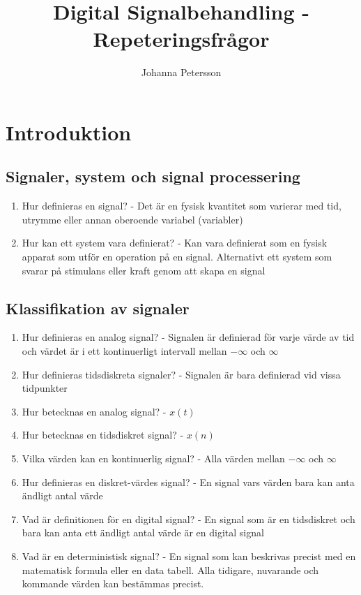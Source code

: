\documentclass[11pt]{report}
\begin{document}
\title{Digital Signalbehandling - Repeteringsfrågor}
\author{Johanna Petersson}
\maketitle

\chapter{Introduktion}
\section{Signaler, system och signal processering}
\begin{enumerate}
	\item Hur definieras en signal? - Det är en fysisk kvantitet som varierar med tid, utrymme eller annan oberoende variabel (variabler) 
	\item Hur kan ett system vara definierat? - Kan vara definierat som en fysisk apparat som utför en operation på en signal. Alternativt ett system som svarar på stimulans eller kraft genom att skapa en signal
\end{enumerate}

\section{Klassifikation av signaler}
\begin{enumerate}
	\item Hur definieras en analog signal? - Signalen är definierad för varje värde av tid och värdet är i ett kontinuerligt intervall mellan $-\infty$ och $\infty$
	\item Hur definieras tidsdiskreta signaler? - Signalen är bara definierad vid vissa tidpunkter
	\item Hur betecknas en analog signal? - $x(t)$
	\item Hur betecknas en tidsdiskret signal? - $x(n)$
	\item Vilka värden kan en kontinuerlig signal? - Alla värden mellan $-\infty$ och $\infty$
	\item Hur definieras en diskret-värdes signal? - En signal vars värden bara kan anta ändligt antal värde 
	\item Vad är definitionen för en digital signal? - En signal som är en tidsdiskret och bara kan anta ett ändligt antal värde är en digital signal 
	\item Vad är en deterministisk signal? - En signal som kan beskrivas precist med en matematisk formula eller en data tabell. Alla tidigare, nuvarande och kommande värden kan bestämmas precist. 
\end{enumerate}
\end{document}

